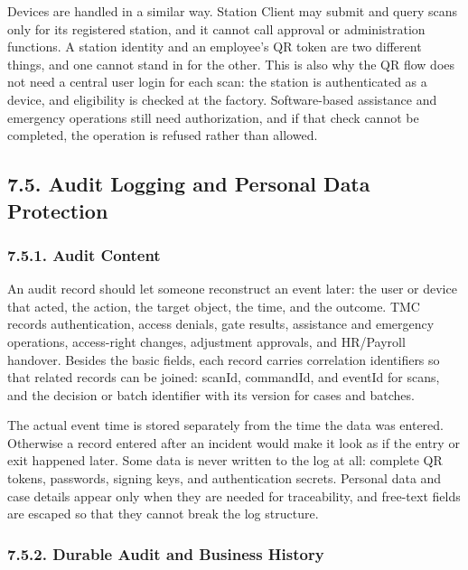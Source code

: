 Devices are handled in a similar way. Station Client may submit and query scans only for its registered station, and it cannot call approval or administration functions. A station identity and an employee's QR token are two different things, and one cannot stand in for the other. This is also why the QR flow does not need a central user login for each scan: the station is authenticated as a device, and eligibility is checked at the factory. Software-based assistance and emergency operations still need authorization, and if that check cannot be completed, the operation is refused rather than allowed.

\subsection*{7.5. Audit Logging and Personal Data Protection}

{}

\subsubsection*{7.5.1. Audit Content}

{}

An audit record should let someone reconstruct an event later: the user or device that acted, the action, the target object, the time, and the outcome. TMC records authentication, access denials, gate results, assistance and emergency operations, access-right changes, adjustment approvals, and HR/Payroll handover. Besides the basic fields, each record carries correlation identifiers so that related records can be joined: scanId, commandId, and eventId for scans, and the decision or batch identifier with its version for cases and batches.

The actual event time is stored separately from the time the data was entered. Otherwise a record entered after an incident would make it look as if the entry or exit happened later. Some data is never written to the log at all: complete QR tokens, passwords, signing keys, and authentication secrets. Personal data and case details appear only when they are needed for traceability, and free-text fields are escaped so that they cannot break the log structure.

\subsubsection*{7.5.2. Durable Audit and Business History}


